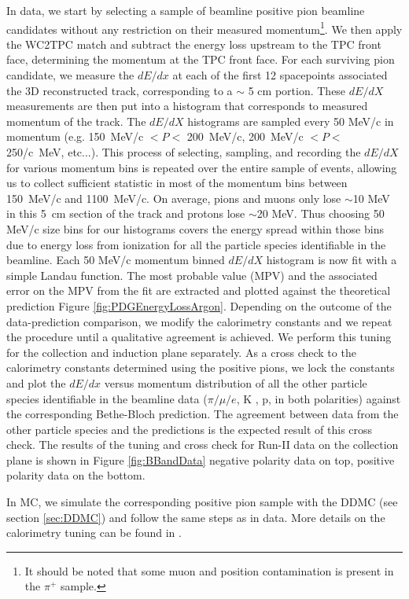 In data, we start by selecting a sample of beamline positive pion beamline candidates without any restriction on their measured momentum\footnote{It should be noted that some muon and position contamination is present in the $\pi^+$ sample.}.
We then apply the WC2TPC match and subtract the energy loss upstream to the TPC front face, determining the momentum at the TPC front face. For each surviving pion candidate,  we measure the $dE/dx$ at each of the first 12 spacepoints associated the 3D reconstructed track, corresponding to a $\sim$ 5 cm portion. These $dE/dX$ measurements are then put into a histogram that corresponds to measured momentum of the track. The $dE/dX$ histograms are sampled every 50 MeV/c in momentum (e.g. 150~MeV/c $< P <$ 200~MeV/c, 200~MeV/c $< P <$ 250/c~MeV, etc...).   This process of selecting, sampling, and recording the $dE/dX$ for various momentum bins is repeated over the entire sample of events, allowing us to collect sufficient statistic in most of the momentum bins between 150~MeV/c and 1100~MeV/c. On average, pions and muons only lose $\sim$10 MeV in this 5~cm section of the track and protons lose $\sim$20 MeV. Thus choosing 50 MeV/c size bins for our histograms covers the energy spread within those bins due to energy loss from ionization for all the particle species identifiable in the beamline. 
Each 50 MeV/c momentum binned $dE/dX$ histogram is now fit with a simple Landau function. The most probable value (MPV) and the associated error on the MPV from the fit are extracted and plotted against the theoretical prediction Figure \ref{fig:PDGEnergyLossArgon}. Depending on the outcome of the data-prediction comparison, we modify the calorimetry constants and we repeat the procedure until a qualitative agreement is achieved.  We perform this  tuning for the collection and induction plane separately. 
As a cross check to the calorimetry constants determined using the positive pions, we lock the constants and  plot the $dE/dx$ versus momentum distribution of all the other particle species identifiable in the beamline data ($\pi/\mu/e$, K , p, in both polarities) against the corresponding Bethe-Bloch prediction. The agreement between data from the other particle species and the predictions is the expected result of this cross check.
The results of the tuning and cross check for Run-II data on the collection plane is shown in Figure \ref{fig:BBandData}  negative polarity data on top, positive polarity data on the bottom.

In MC, we simulate the corresponding positive pion sample with the DDMC (see section \ref{sec:DDMC}) and follow the same steps as in data. More details on the calorimetry tuning can be found in \cite{LArIATCalo}.

